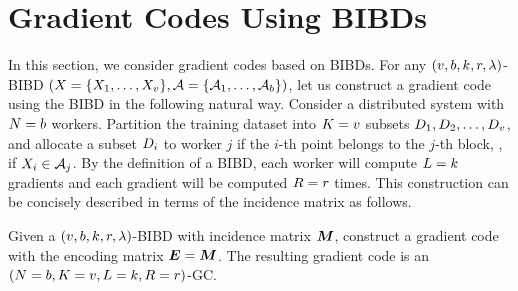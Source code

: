 \documentclass[conference,letterpaper]{IEEEtran}
\begin{document}




\section{Gradient Codes Using BIBDs}
\label{sec:code-bibd}
In this section, we consider gradient codes based on BIBDs. For any $(v,b,k,r,\lambda)$-BIBD $(X = \{X_1,\ldots,X_{v}\}, \mathcal{A} = \{\mathcal{A}_1,\ldots,\mathcal{A}_{b}\})$, let us construct a gradient code using the BIBD in the following natural way. Consider a distributed system with $N = b$ workers. Partition the training dataset into $K = v$ subsets $D_{1},D_{2},\ldots,D_{v}$, and allocate a subset $D_{i}$ to worker $j$ if the $i$-th point belongs to the $j$-th block, \ie, if $X_i\in\mathcal{A}_j$. 
By the definition of a BIBD, each worker will compute $L = k$ gradients and each gradient will be computed $R = r$ times. This construction can be concisely described in terms of the incidence matrix as follows.

\begin{construction}
\label{con:BIBD-code}
Given a $(v,b,k,r,\lambda)$-BIBD with incidence matrix $\boldsymbol{M}$, construct a gradient code with the encoding matrix  $\boldsymbol{E} = \boldsymbol{M}$. %
The resulting gradient code is an $(N = b, K = v, L = k, R = r)$-GC.
\end{construction}
\end{document}
